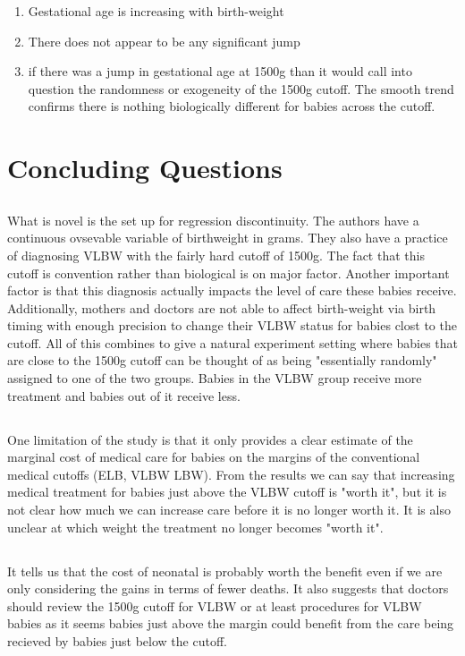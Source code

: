 \documentclass[11pt]{article}
\begin{document}
\begin{enumerate}
	\item Gestational age is increasing with birth-weight
	\item There does not appear to be any significant jump 
	\item if there was a jump in gestational age at 1500g than it would call into question the randomness or exogeneity of the 1500g cutoff. The smooth trend confirms there is nothing biologically different for babies across the cutoff. 
\end{enumerate}

\section{Concluding Questions}
\subsection{}
What is novel is the set up for regression discontinuity. The authors have a continuous ovsevable variable of birthweight in grams. They also have a practice of diagnosing VLBW with the fairly hard cutoff of 1500g. The fact that this cutoff is convention rather than biological is on major factor. Another important factor is that this diagnosis actually impacts the level of care these babies receive. Additionally, mothers and doctors are not able to affect birth-weight via birth timing with enough precision to change their VLBW status for babies clost to the cutoff. All of this combines to give a natural experiment setting where babies that are close to the 1500g cutoff can be thought of as being "essentially randomly" assigned to one of the two groups. Babies in the VLBW group receive more treatment and babies out of it receive less.

\subsection{}

One limitation of the study is that it only provides a clear estimate of the marginal cost of medical care for babies on the margins of the conventional medical cutoffs (ELB, VLBW LBW). From the results we can say that increasing medical treatment for babies just above the VLBW cutoff is "worth it", but it is not clear how much we can increase care before it is no longer worth it. It is also unclear at which weight the treatment no longer becomes "worth it". 

\subsection{}
It tells us that the cost of neonatal is probably worth the benefit even if we are only considering the gains in terms of fewer deaths. It also suggests that doctors should review the 1500g cutoff for VLBW or at least procedures for VLBW babies as it seems babies just above the margin could benefit from the care being recieved by babies just below the cutoff. 




\end{document}
